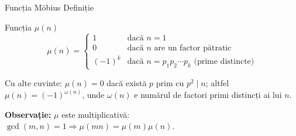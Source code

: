\documentclass[10pt]{beamer}
\begin{document}
\begin{frame}{Funcția Möbius \textemdash{} Definiție}
  \begin{block}{Funcția $\mu(n)$}
    \[
      \mu(n) = \begin{cases}
        1 & \text{dacă } n = 1 \\
        0 & \text{dacă } n \text{ are un factor pătratic} \\
        (-1)^k & \text{dacă } n = p_1 p_2 \cdots p_k \text{ (prime distincte)}
      \end{cases}
    \]
  \end{block}
  \smallskip
  Cu alte cuvinte: $\mu(n) = 0$ dacă există $p$ prim cu $p^2 \mid n$;
  altfel $\mu(n) = (-1)^{\omega(n)}$, unde $\omega(n)$ e numărul de factori
  primi distincți ai lui $n$.
  \smallskip

  \textbf{Observație:} $\mu$ este multiplicativă: $\gcd(m,n)=1 \Rightarrow \mu(mn) = \mu(m)\mu(n)$.
\end{frame}
\end{document}
